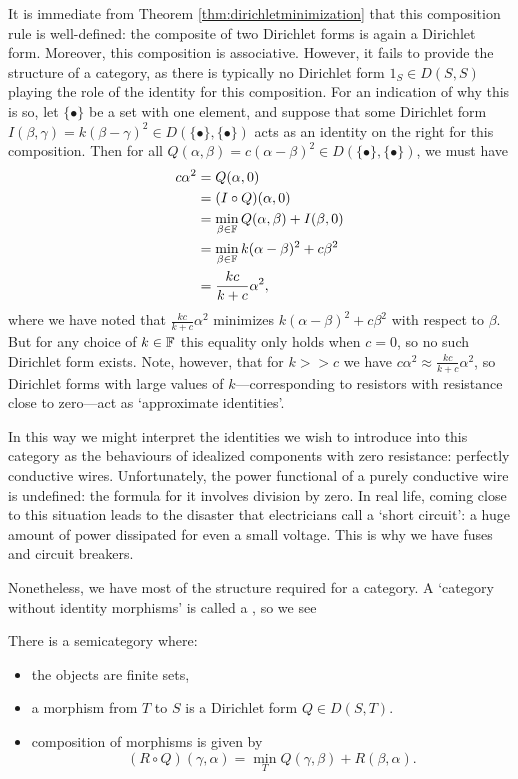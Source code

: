 It is immediate from Theorem \ref{thm:dirichletminimization} that this
composition rule is well-defined: the composite of two Dirichlet forms is again
a Dirichlet form. Moreover, this composition is associative. However, it fails
to provide the structure of a category, as there is typically no Dirichlet form
$1_S \in D(S,S)$ playing the role of the identity for this composition. For an
indication of why this is so, let $\{\bullet\}$ be a set with one element, and
suppose that some Dirichlet form $I(\beta,\gamma) = k(\beta-\gamma)^2 \in
D(\{\bullet\},\{\bullet\})$ acts as an identity on the right for this
composition. Then for all $Q(\alpha,\beta) = c(\alpha-\beta)^2 \in
D(\{\bullet\},\{\bullet\})$, we must have
\begin{align*}
  c\alpha^2 &= Q(\alpha,0) \\
  &= (I \circ Q)(\alpha,0) \\ 
  &= \min_{\beta \in {\mathbb F}} Q(\alpha, \beta) + I(\beta,0) \\
  &= \min_{\beta \in {\mathbb F}} k(\alpha-\beta)^2 + c\beta^2 \\
  &= \frac{kc}{k+c}\alpha^2,
\end{align*}
where we have noted that $\frac{kc}{k+c}\alpha^2$ minimizes $k(\alpha-\beta)^2 +
c\beta^2$ with respect to $\beta$. But for any choice of $k \in {\mathbb F}$ this
equality only holds when $c = 0$, so no such Dirichlet form exists. Note,
however, that for $k>> c$ we have $c\alpha^2 \approx \frac{kc}{k+c}\alpha^2$, so
Dirichlet forms with large values of $k$---corresponding to resistors with
resistance close to zero---act as `approximate identities'.

In this way we might interpret the identities we wish to introduce
into this category as the behaviours of idealized components with zero
resistance: perfectly conductive wires. Unfortunately, the power functional of a
purely conductive wire is undefined: the formula for it involves division by
zero.  In real life, coming close to this situation leads to the disaster that
electricians call a `short circuit': a huge amount of power dissipated for even
a small voltage.  This is why we have fuses and circuit breakers.

Nonetheless, we have most of the structure required for a category. A `category
without identity morphisms' is called a , so we see
\begin{proposition}
There is a semicategory where:
\begin{itemize}
\item the objects are finite sets,

\item a morphism from $T$ to $S$ is a Dirichlet form $Q \in D(S,T)$.  

\item composition of morphisms is given by 
\[
(R \circ Q)(\gamma, \alpha) = \min_{T} Q(\gamma, \beta) + R(\beta, \alpha).
\]

\end{itemize}
\end{proposition}

